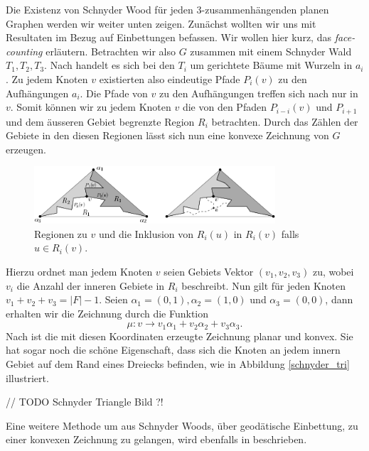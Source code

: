 Die Existenz von Schnyder Wood für jeden 3-zusammenhängenden planen Graphen werden wir weiter unten zeigen. Zunächst wollten wir uns mit Resultaten im Bezug auf Einbettungen befassen.
Wir wollen hier kurz, das \textit{face-counting}\cite{felsner01} erläutern. Betrachten wir also $G$ zusammen mit einem Schnyder Wald $T_1,T_2,T_3$. Nach \cite[Korollar 2.5]{felsner04} handelt es sich bei den $T_i$ um gerichtete Bäume mit Wurzeln in $a_i$. Zu jedem Knoten $v$ existierten also eindeutige Pfade $P_i(v)$ zu den Aufhängungen $a_i$. Die Pfade von $v$ zu den Aufhängungen treffen sich nach \cite[Lemma 2.4]{felsner04} nur in $v$. Somit können wir zu jedem Knoten $v$ die von den Pfaden $P_{i-i}(v)$ und $P_{i+1}$ und dem äusseren Gebiet begrenzte Region $R_i$ betrachten. Durch das Zählen der Gebiete in den diesen Regionen lässt sich nun eine konvexe Zeichnung von $G$ erzeugen.

\begin{figure}[h]
	\centering
  \includegraphics[width=0.8\textwidth]{schnyder_reg.png}
	\caption{Regionen zu $v$ und die Inklusion von $R_i(u)$ in $R_i(v)$ falls $u \in R_i(v)$.}
\end{figure}

Hierzu ordnet man jedem Knoten $v$ seien Gebiets Vektor $(v_1,v_2,v_3)$ zu, wobei $v_i$ die Anzahl der inneren Gebiete in $R_i$ beschreibt. Nun gilt für jeden Knoten $v_1+v_2+v_3 = |F|-1$. Seien $\alpha_1 = (0,1),\alpha_2 = (1,0)$ und $\alpha_3 = (0,0)$, dann erhalten wir die Zeichnung durch die Funktion 
$$\mu:v\to v_1\alpha_1 + v_2\alpha_2+v_3\alpha_3.$$ 
Nach \cite[Theorem 2.7]{felsner04} ist die mit diesen Koordinaten erzeugte Zeichnung planar und konvex. Sie hat sogar noch die schöne Eigenschaft, dass sich die Knoten an jedem innern Gebiet auf dem Rand eines Dreiecks befinden, wie in Abbildung \ref{schnyder_tri} illustriert.\

// TODO Schnyder Triangle Bild ?!

Eine weitere Methode um aus Schnyder Woods, über geodätische Einbettung, zu einer konvexen Zeichnung zu gelangen, wird ebenfalls in \cite{felsner04} beschrieben.

